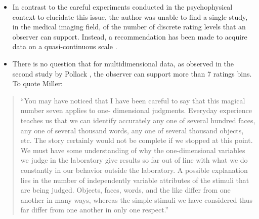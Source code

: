 \documentclass[
]{book}
\begin{document}
\begin{itemize}
\item
  In contrast to the careful experiments conducted in the psychophysical context to elucidate this issue, the author was unable to find a single study, in the medical imaging field, of the number of discrete rating levels that an observer can support. Instead, a recommendation has been made to acquire data on a quasi-continuous scale \citep{RN2179}.
\item
  There is no question that for multidimensional data, as observed in the second study by Pollack \citep{RN2474}, the observer can support more than 7 ratings bins. To quote Miller:
\end{itemize}

\begin{quote}
``You may have noticed that I have been careful to say that this magical number seven applies to one- dimensional judgments. Everyday experience teaches us that we can identify accurately any one of several hundred faces, any one of several thousand words, any one of several thousand objects, etc. The story certainly would not be complete if we stopped at this point. We must have some understanding of why the one-dimensional variables we judge in the laboratory give results so far out of line with what we do constantly in our behavior outside the laboratory. A possible explanation lies in the number of independently variable attributes of the stimuli that are being judged. Objects, faces, words, and the like differ from one another in many ways, whereas the simple stimuli we have considered thus far differ from one another in only one respect.''
\end{quote}
\end{document}
